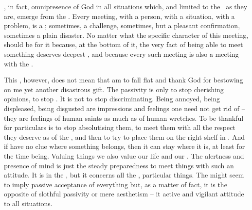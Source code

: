 
\label{pa:actpass}  , in fact, omnipresence of God in all situations which,
 and limited to the \hoa\ as they are, emerge from the .
Every meeting, with a person, with a situation, with a problem, is a ;
sometimes, a challenge, sometimes, but a pleasant confirmation, sometimes a
plain disaster.  No matter what the specific character of this meeting, 
should be  for it because, at the bottom of it, the very fact of
being able to meet something deserves deepest , and because every
such meeting is also a meeting with the .

This , however, does not mean that  am to fall flat and
thank God for bestowing on me yet another disastrous gift.  The 
passivity is only to stop cherishing opinions, to stop 
. It is not to stop discriminating.  Being annoyed, being
displeased, being disgusted are impressions and feelings one need not get rid of
-- they are feelings of human saints as much as of human wretches.  To be
thankful for particulars is to stop absolutising them, to meet them with all the
respect they deserve as  of the , and then to try to place
them on the right shelf in .
%
And if  have no clue where something belongs, then it can stay where it
is, at least for the time being.  Valuing things we also value our life and
 our .  The alertness and presence of mind is just the
steady preparedness to meet things with such an attitude.  It is  in
the , but it concerns all the ,
particular things. The  might seem to imply passive
acceptance of everything but, as a matter of fact, it is the opposite of
slothful passivity or mere aesthetism -- it  active and vigilant
attitude to all  situations.

